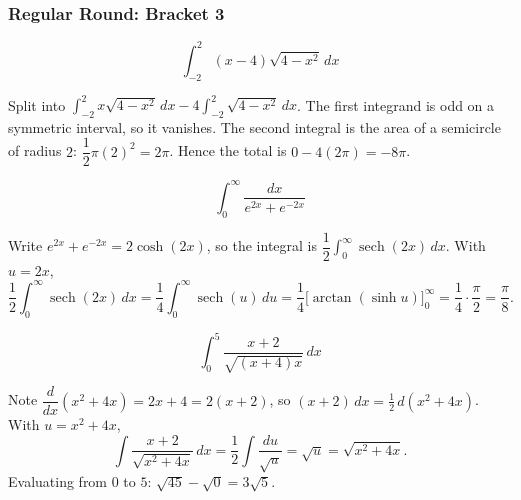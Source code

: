 \subsubsection*{Regular Round: Bracket 3}
\begin{questions}

\question \[\int_{-2}^2 (x-4)\sqrt{4-x^2}\,dx\]
\begin{solution}
Split into $\displaystyle\int_{-2}^2 x\sqrt{4-x^2}\,dx-4\int_{-2}^2\sqrt{4-x^2}\,dx$. The first integrand is odd on a symmetric interval, so it vanishes. The second integral is the area of a semicircle of radius $2$: $\dfrac12\pi(2)^2=2\pi$. Hence the total is $0-4(2\pi)=-8\pi$.
\end{solution}

\question \[\int_0^\infty \frac{dx}{e^{2x}+e^{-2x}}\]
\begin{solution}
Write $e^{2x}+e^{-2x}=2\cosh(2x)$, so the integral is $\dfrac12\displaystyle\int_0^\infty \operatorname{sech}(2x)\,dx$. With $u=2x$,
\[
\frac12\int_0^\infty \operatorname{sech}(2x)\,dx=\frac14\int_0^\infty \operatorname{sech}(u)\,du=\frac14\Big[\arctan(\sinh u)\Big]_0^\infty=\frac14\cdot\frac{\pi}{2}=\frac{\pi}{8}.
\]
\end{solution}

\question \[\int_0^5 \frac{x+2}{\sqrt{(x+4)x}}\,dx\]
\begin{solution}
Note $\dfrac{d}{dx}(x^2+4x)=2x+4=2(x+2)$, so $(x+2)\,dx=\tfrac12\,d(x^2+4x)$. With $u=x^2+4x$,
\[
\int \frac{x+2}{\sqrt{x^2+4x}}\,dx=\frac12\int \frac{du}{\sqrt u}=\sqrt u=\sqrt{x^2+4x}.
\]
Evaluating from $0$ to $5$: $\sqrt{45}-\sqrt0=3\sqrt5$.
\end{solution}

\end{questions}

